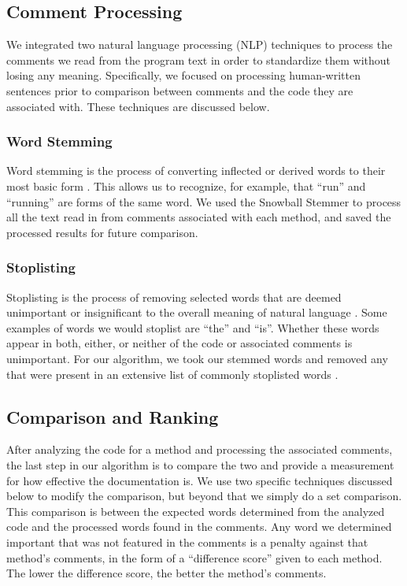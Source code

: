\documentclass[preprint]{sigplanconf}
\begin{document}
\subsection{Comment Processing}
We integrated two natural language processing (NLP) techniques to process the comments we read from the program text in order to standardize them without losing any meaning. Specifically, we focused on processing human-written sentences prior to comparison between comments and the code they are associated with. These techniques are discussed below.

\subsubsection{Word Stemming}
Word stemming is the process of converting inflected or derived words to their most basic form \cite{xapian}. This allows us to recognize, for example, that ``run'' and ``running'' are forms of the same word. We used the Snowball Stemmer \cite{snowball} to process all the text read in from comments associated with each method, and saved the processed results for future comparison.

\subsubsection{Stoplisting}
Stoplisting is the process of removing selected words that are deemed unimportant or insignificant to the overall meaning of natural language \cite{rajaraman}. Some examples of words we would stoplist are ``the'' and ``is''. Whether these words appear in both, either, or neither of the code or associated comments is unimportant. For our algorithm, we took our stemmed words and removed any that were present in an extensive list of commonly stoplisted words \cite{xpo6}.

\subsection{Comparison and Ranking}
After analyzing the code for a method and processing the associated comments, the last step in our algorithm is to compare the two and provide a measurement for how effective the documentation is. We use two specific techniques discussed below to modify the comparison, but beyond that we simply do a set comparison.
This comparison is between the expected words determined from the analyzed code and the processed words found in the comments. Any word we determined important that was not featured in the comments is a penalty against that method's comments, in the form of a ``difference score'' given to each method. The lower the difference score, the better the method's comments.
\end{document}
